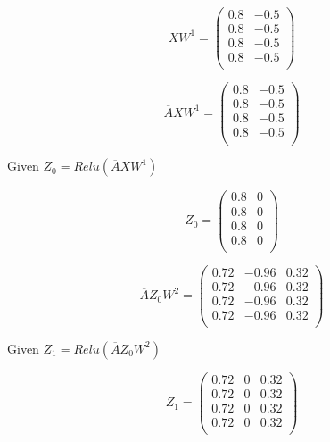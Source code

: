 \documentclass[a4paper]{article}
\begin{document}
\begin{equation}
X W^{1}=
\begin{pmatrix}
0.8 & -0.5\\
0.8 & -0.5\\
0.8 & -0.5\\
0.8 & -0.5\\
\end{pmatrix}
\end{equation}

\begin{equation}
\overline{A} X W^{1}=
\begin{pmatrix}
0.8 & -0.5\\
0.8 & -0.5\\
0.8 & -0.5\\
0.8 & -0.5\\
\end{pmatrix}
\end{equation}

Given $Z_{0}=Relu(\overline{A} X W^{1})$

\begin{equation}
Z_{0}=
\begin{pmatrix}
0.8 & 0\\
0.8 & 0\\
0.8 & 0\\
0.8 & 0\\
\end{pmatrix}
\end{equation}

\begin{equation}
\overline{A} Z_{0} W^{2}=
\begin{pmatrix}
0.72 & -0.96 & 0.32\\
0.72 & -0.96 & 0.32\\
0.72 & -0.96 & 0.32\\
0.72 & -0.96 & 0.32\\
\end{pmatrix}
\end{equation}

Given $Z_{1}= Relu(\overline{A} Z_{0} W^{2})$

\begin{equation}
Z_{1}=
\begin{pmatrix}
0.72 & 0 & 0.32\\
0.72 & 0 & 0.32\\
0.72 & 0 & 0.32\\
0.72 & 0 & 0.32\\
\end{pmatrix}
\end{equation}
\end{document}
